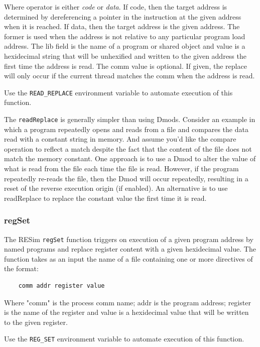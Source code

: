 \documentclass[titlepage]{article}
\begin{document}
Where operator is either \textit{code} or \textit{data}.  If code, then the target
address is determined by dereferencing a pointer in the instruction
at the given address when it is reached.  If data, then the target
address is the given address. The former is used when the address is not relative
to any particular program load address. 
The lib field is the name of a program or shared object and value
is a hexidecimal string that will be unhexified and written to the given
address the first time the address is read.  
The comm value is optional.  If given, the replace will only occur if the
current thread matches the comm when the address is read.

Use the {\tt READ\_REPLACE} environment variable to automate execution of this function.

The {\tt readReplace} is generally simpler than using Dmods.  Consider an example in which a program
repeatedly opens and reads from a file and compares the data read with a constant string in memory.
And assume you'd like the compare operation to reflect a match despite the fact that the content of
the file does not match the memory constant.  One approach is to use a Dmod to alter the value of what
is read from the file each time the file is read.  However, if the program repeatedly re-reads the file,
then the Dmod will occur repeatedly, resulting in a reset of the reverse execution origin (if enabled).
An alternative is to use readReplace to replace the constant value the first time it is read.  

\subsubsection{regSet}
\label{reg-set}
The RESim {\tt regSet} function triggers on execution of a given program address
by named programs and replace register content with a given hexidecimal value.  The function takes as an
input the name of a file containing one or more directives of the format:
\begin{verbatim}
    comm addr register value
\end{verbatim}
Where "comm" is the process comm name; addr is the program address; register is the
name of the register and value is a hexidecimal value that will be written to the given
register.

Use the {\tt REG\_SET} environment variable to automate execution of this function.
\end{document}
